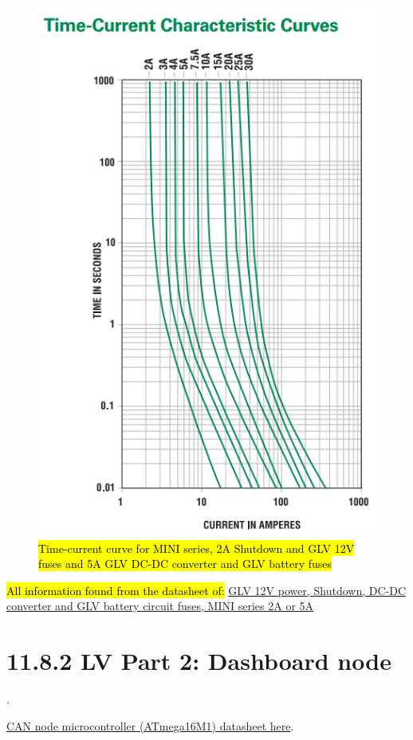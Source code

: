 \documentclass{article}
\DeclareRobustCommand{\hlr}[1]{{\sethlcolor{red}\hl{#1}}}
\begin{document}
\begin{figure}[H]
    \centering
    \includegraphics[width = 0.6 \textwidth]{shutdownfusecurve}
    \caption{\hlr{Time-current curve for MINI series, 2A Shutdown and GLV 12V fuses and 5A GLV DC-DC converter and GLV battery fuses}}
    \label{shutdownfusecurve}
\end{figure}

\hlr{All information found from the datasheet of: }
\href{http://www.littelfuse.com/~/media/automotive/datasheets/fuses/automotive-fuses/littelfuse_automotive_blade_fuse_mini_32v.pdf}{GLV 12V power, Shutdown, DC-DC converter and GLV battery circuit fuses, MINI series 2A or 5A}

\section*{11.8.2 LV Part 2: Dashboard node}.

\href{http://www.atmel.com/images/8209s.pdf}{CAN node microcontroller (ATmega16M1) datasheet here}.
\end{document}
